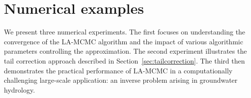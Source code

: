 \documentclass{svjour3}
\begin{document}






\section{Numerical examples}
\label{sec:examples}
We present three numerical experiments. The first focuses on understanding the convergence of the LA-MCMC algorithm and the impact of various algorithmic parameters controlling the approximation. The second experiment illustrates the tail correction approach described in Section~\ref{sec:tailcorrection}. The third then demonstrates the practical performance of LA-MCMC in a computationally challenging large-scale application: an inverse problem arising in groundwater hydrology.










\appendix






\end{document}
